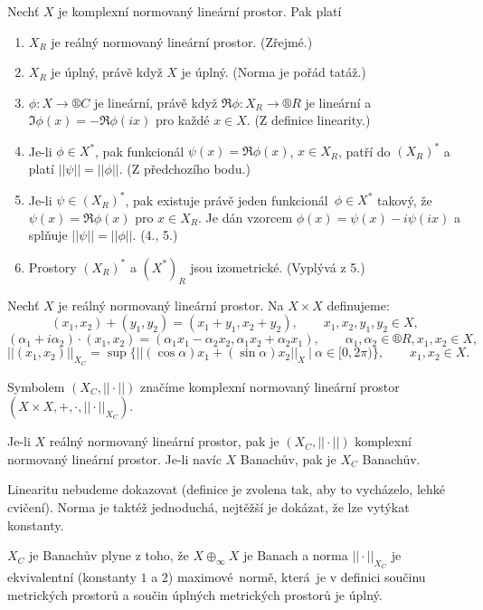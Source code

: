 \documentclass[12pt]{article}					%
\begin{document}
\begin{veta}
	Nechť $X$ je komplexní normovaný lineární prostor. Pak platí\vspace{-1em}
	
	\begin{enumerate}
		\item $X_R$ je reálný normovaný lineární prostor. (Zřejmé.)
		\item $X_R$ je úplný, právě když $X$ je úplný. (Norma je pořád tatáž.)
		\item $\phi: X \rightarrow ®C$ je lineární, právě když $\Re \phi: X_R \rightarrow ®R$ je lineární a $\Im \phi(x) = -\Re \phi(ix)$ pro každé $x \in X$. (Z definice linearity.)
		\item Je-li $\phi \in X^*$, pak funkcionál $\psi(x) = \Re \phi(x)$, $x \in X_R$, patří do $(X_R)^*$ a platí $||\psi|| = ||\phi||$. (Z předchozího bodu.)
		\item Je-li $\psi \in (X_R)^*$, pak existuje právě jeden funkcionál $\phi \in X^*$ takový, že $\psi(x) = \Re \phi(x)$ pro $x \in X_R$. Je dán vzorcem $\phi(x) = \psi(x) - i\psi(ix)$ a splňuje $||\psi|| = ||\phi||$. (4., 5.)
		\item Prostory $(X_R)^*$ a $(X^*)_R$ jsou izometrické.  (Vyplývá z 5.)
	\end{enumerate}
\end{veta}

\begin{definice}
	Nechť $X$ je reálný normovaný lineární prostor. Na $X \times X$ definujeme:
	$$ (x_1, x_2) + (y_1, y_2) = (x_1 + y_1, x_2 + y_2), \qquad x_1, x_2, y_1, y_2 \in X, $$
	$$ (\alpha_1 + i\alpha_2)·(x_1, x_2) = (\alpha_1x_1 - \alpha_2x_2, \alpha_1x_2 + \alpha_2 x_1), \qquad \alpha_1, \alpha_2 \in ®R, x_1, x_2 \in X, $$
	$$ ||(x_1, x_2)||_{X_C} = \sup\{||(\cos \alpha)x_1 + (\sin \alpha)x_2||_X\ |\ \alpha \in [0, 2\pi)\}, \qquad x_1, x_2 \in X. $$

	Symbolem $(X_C, ||·||)$ značíme komplexní normovaný lineární prostor $(X \times X, +, ·, ||·||_{X_C})$.
\end{definice}

\begin{veta}[Komplexifikace]
	Je-li $X$ reálný normovaný lineární prostor, pak je $(X_C, ||·||)$ komplexní normovaný lineární prostor. Je-li navíc $X$ Banachův, pak je $X_C$ Banachův.

	\begin{dukazin}
		Linearitu nebudeme dokazovat (definice je zvolena tak, aby to vycházelo, lehké cvičení). Norma je taktéž jednoduchá, nejtěžší je dokázat, že lze vytýkat konstanty.

		$X_C$ je Banachův plyne z toho, že $X \oplus_∞ X$ je Banach a norma $||·||_{X_C}$ je ekvivalentní (konstanty $1$ a $2$) maximové normě, která je v definici součinu metrických prostorů a součin úplných metrických prostorů je úplný.
	\end{dukazin}
\end{veta}
\end{document}
